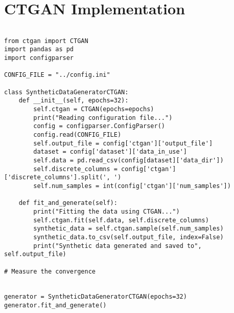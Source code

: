 \chapter*{CTGAN Implementation}
\label{app:ctganimplementation}

\begin{verbatim}

from ctgan import CTGAN
import pandas as pd
import configparser

CONFIG_FILE = "../config.ini"

class SyntheticDataGeneratorCTGAN:
    def __init__(self, epochs=32):
        self.ctgan = CTGAN(epochs=epochs)
        print("Reading configuration file...")
        config = configparser.ConfigParser()
        config.read(CONFIG_FILE)
        self.output_file = config['ctgan']['output_file']
        dataset = config['dataset']['data_in_use']
        self.data = pd.read_csv(config[dataset]['data_dir'])
        self.discrete_columns = config['ctgan']['discrete_columns'].split(', ')
        self.num_samples = int(config['ctgan']['num_samples'])
    
    def fit_and_generate(self):
        print("Fitting the data using CTGAN...")
        self.ctgan.fit(self.data, self.discrete_columns)
        synthetic_data = self.ctgan.sample(self.num_samples)
        synthetic_data.to_csv(self.output_file, index=False)
        print("Synthetic data generated and saved to", self.output_file)

# Measure the convergence


generator = SyntheticDataGeneratorCTGAN(epochs=32)
generator.fit_and_generate()

\end{verbatim}